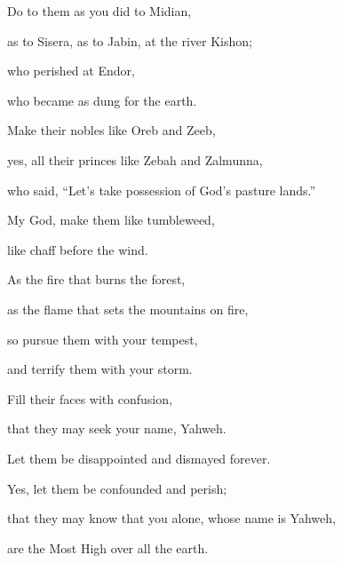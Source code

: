 {\Q {}Do to them as you did to Midian,
\par }{\QB as to Sisera, as to Jabin, at the river Kishon;
\par }{\Q {}who perished at Endor,
\par }{\QB who became as dung for the earth.
\par }{\Q {}Make their nobles like Oreb and Zeeb,
\par }{\QB yes, all their princes like Zebah and Zalmunna,
\par }{\QB {}who said, “Let’s take possession of God’s pasture lands.”
\par }{\Q {}My God, make them like tumbleweed,
\par }{\QB like chaff before the wind.
\par }{\Q {}As the fire that burns the forest,
\par }{\QB as the flame that sets the mountains on fire,
\par }{\QB {}so pursue them with your tempest,
\par }{\QB and terrify them with your storm.
\par }{\Q {}Fill their faces with confusion,
\par }{\QB that they may seek your name, Yahweh.
\par }{\Q {}Let them be disappointed and dismayed forever.
\par }{\QB Yes, let them be confounded and perish;
\par }{\Q {}that they may know that you alone, whose name is Yahweh,
\par }{\QB are the Most High over all the earth.

\par }
